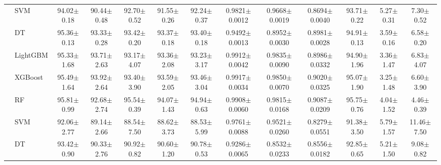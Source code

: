 \begin{tabular}{@{}llccccccccccc@{}}
 & SVM & 94.02{\tiny$\pm$0.18} & 90.44{\tiny$\pm$0.48} & 92.70{\tiny$\pm$0.52} & 91.55{\tiny$\pm$0.26} & 92.24{\tiny$\pm$0.37} & 0.9821{\tiny$\pm$0.0012} & 0.9668{\tiny$\pm$0.0019} & 0.8694{\tiny$\pm$0.0040} & 93.71{\tiny$\pm$0.22} & 5.27{\tiny$\pm$0.31} & 7.30{\tiny$\pm$0.52}\\
 & DT & 95.36{\tiny$\pm$0.13} & 93.33{\tiny$\pm$0.28} & 93.42{\tiny$\pm$0.20} & 93.37{\tiny$\pm$0.18} & 93.40{\tiny$\pm$0.18} & 0.9492{\tiny$\pm$0.0013} & 0.8952{\tiny$\pm$0.0030} & 0.8981{\tiny$\pm$0.0028} & 94.91{\tiny$\pm$0.13} & 3.59{\tiny$\pm$0.16} & 6.58{\tiny$\pm$0.20}\\
\midrule
{} & LightGBM & 95.33{\tiny$\pm$1.68} & 93.71{\tiny$\pm$2.63} & 93.17{\tiny$\pm$4.07} & 93.36{\tiny$\pm$2.08} & 93.23{\tiny$\pm$3.17} & 0.9912{\tiny$\pm$0.0042} & 0.9835{\tiny$\pm$0.0090} & 0.8986{\tiny$\pm$0.0332} & 94.90{\tiny$\pm$1.96} & 3.36{\tiny$\pm$1.47} & 6.83{\tiny$\pm$4.07}\\
 & XGBoost & 95.49{\tiny$\pm$1.64} & 93.92{\tiny$\pm$2.64} & 93.40{\tiny$\pm$3.90} & 93.59{\tiny$\pm$2.05} & 93.46{\tiny$\pm$3.04} & 0.9917{\tiny$\pm$0.0034} & 0.9850{\tiny$\pm$0.0070} & 0.9020{\tiny$\pm$0.0325} & 95.07{\tiny$\pm$1.90} & 3.25{\tiny$\pm$1.48} & 6.60{\tiny$\pm$3.90}\\
 & RF & 95.81{\tiny$\pm$0.99} & 92.68{\tiny$\pm$2.74} & 95.54{\tiny$\pm$0.39} & 94.07{\tiny$\pm$1.43} & 94.94{\tiny$\pm$0.63} & 0.9908{\tiny$\pm$0.0060} & 0.9815{\tiny$\pm$0.0168} & 0.9087{\tiny$\pm$0.0209} & 95.75{\tiny$\pm$0.76} & 4.04{\tiny$\pm$1.52} & 4.46{\tiny$\pm$0.39}\\
 & SVM & 92.06{\tiny$\pm$2.77} & 89.14{\tiny$\pm$2.66} & 88.54{\tiny$\pm$7.50} & 88.62{\tiny$\pm$3.73} & 88.53{\tiny$\pm$5.99} & 0.9761{\tiny$\pm$0.0088} & 0.9521{\tiny$\pm$0.0260} & 0.8279{\tiny$\pm$0.0551} & 91.38{\tiny$\pm$3.50} & 5.79{\tiny$\pm$1.57} & 11.46{\tiny$\pm$7.50}\\
 & DT & 93.42{\tiny$\pm$0.90} & 90.33{\tiny$\pm$2.76} & 90.92{\tiny$\pm$0.82} & 90.60{\tiny$\pm$1.20} & 90.78{\tiny$\pm$0.53} & 0.9286{\tiny$\pm$0.0065} & 0.8532{\tiny$\pm$0.0233} & 0.8556{\tiny$\pm$0.0182} & 92.85{\tiny$\pm$0.65} & 5.21{\tiny$\pm$1.50} & 9.08{\tiny$\pm$0.82}\\
\bottomrule
\end{tabular}